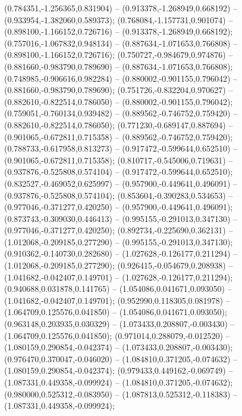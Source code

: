  (0.784351,-1.256365,0.831904) -- (0.913378,-1.268949,0.668192) -- (0.933954,-1.382060,0.589373);
 (0.768084,-1.157731,0.901074) -- (0.898100,-1.166152,0.726716) -- (0.913378,-1.268949,0.668192);
 (0.757016,-1.067832,0.948134) -- (0.887634,-1.071653,0.766808) -- (0.898100,-1.166152,0.726716);
 (0.750727,-0.984679,0.974876) -- (0.881660,-0.983790,0.789690) -- (0.887634,-1.071653,0.766808);
 (0.748985,-0.906616,0.982284) -- (0.880002,-0.901155,0.796042) -- (0.881660,-0.983790,0.789690);
 (0.751726,-0.832204,0.970627) -- (0.882610,-0.822514,0.786050) -- (0.880002,-0.901155,0.796042);
 (0.759051,-0.760134,0.939482) -- (0.889562,-0.746752,0.759420) -- (0.882610,-0.822514,0.786050);
 (0.771230,-0.689147,0.887694) -- (0.901065,-0.672811,0.715358) -- (0.889562,-0.746752,0.759420);
 (0.788733,-0.617958,0.813273) -- (0.917472,-0.599644,0.652510) -- (0.901065,-0.672811,0.715358);
 (0.810717,-0.545006,0.719631) -- (0.937876,-0.525808,0.574104) -- (0.917472,-0.599644,0.652510);
 (0.832527,-0.469052,0.625997) -- (0.957900,-0.449641,0.496091) -- (0.937876,-0.525808,0.574104);
 (0.853604,-0.390283,0.534653) -- (0.977046,-0.371277,0.420250) -- (0.957900,-0.449641,0.496091);
 (0.873743,-0.309030,0.446413) -- (0.995155,-0.291013,0.347130) -- (0.977046,-0.371277,0.420250);
 (0.892734,-0.225690,0.362131) -- (1.012068,-0.209185,0.277290) -- (0.995155,-0.291013,0.347130);
 (0.910362,-0.140730,0.282680) -- (1.027628,-0.126177,0.211294) -- (1.012068,-0.209185,0.277290);
 (0.926415,-0.054679,0.208938) -- (1.041682,-0.042407,0.149701) -- (1.027628,-0.126177,0.211294);
 (0.940688,0.031878,0.141765) -- (1.054086,0.041671,0.093050) -- (1.041682,-0.042407,0.149701);
 (0.952990,0.118305,0.081978) -- (1.064709,0.125576,0.041850) -- (1.054086,0.041671,0.093050);
 (0.963148,0.203935,0.030329) -- (1.073433,0.208807,-0.003430) -- (1.064709,0.125576,0.041850);
 (0.971014,0.288079,-0.012520) -- (1.080159,0.290854,-0.042374) -- (1.073433,0.208807,-0.003430);
 (0.976470,0.370047,-0.046020) -- (1.084810,0.371205,-0.074632) -- (1.080159,0.290854,-0.042374);
 (0.979433,0.449162,-0.069749) -- (1.087331,0.449358,-0.099924) -- (1.084810,0.371205,-0.074632);
 (0.980000,0.525312,-0.083950) -- (1.087813,0.525312,-0.118383) -- (1.087331,0.449358,-0.099924);
